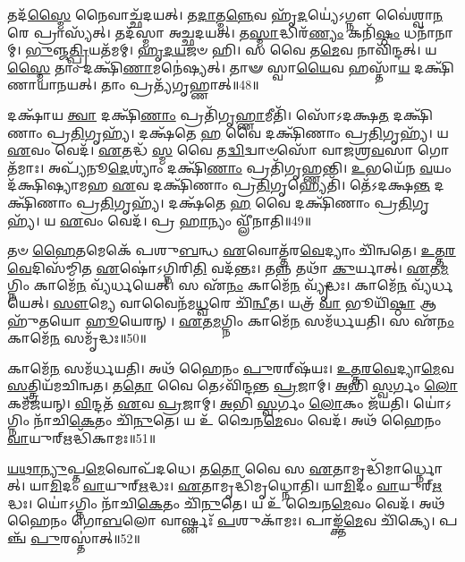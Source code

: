    𑌤𑌦᳴\-\ul{𑌸𑍍𑌮𑍈} 𑌨𑍈𑌵𑌾𑌚𑍍𑌛᳴𑌦𑌯𑌤𑍍।
   𑌤\-\ul{𑌦𑌾}\-𑌤𑍍𑌮\-\ul{𑌨𑍍𑌨𑍇}\-𑌵 𑌹𑍃᳴\-\ul{𑌦}\-𑌯𑍍𑌯𑍇॑𑌽𑌗𑍍𑌨𑍗 𑌵𑍈॑𑌶𑍍𑌵𑌾\-\ul{𑌨}\-𑌰𑍇 𑌪𑍍𑌰𑌾𑌸𑍍𑌯᳴𑌤𑍍।
   𑌤𑌦᳴𑌸𑍍𑌮𑌾 𑌅𑌚𑍍𑌛𑌦𑌯𑌤𑍍।
   𑌤\-\ul{𑌸𑍍𑌮𑌾}\-𑌦𑍍𑌧𑌿𑌰᳴\-\ul{𑌣𑍍𑌯𑌂} 𑌕𑌨𑌿᳴\-\ul{𑌷𑍍𑌠𑌂} 𑌧𑌨𑌾᳴𑌨𑌾𑌮𑍍।
   \ul{𑌭𑍁}\-𑌞𑍍𑌜\-\ul{𑌤𑍍𑌪𑍍𑌰𑌿}\-𑌯𑌤᳴𑌮𑌮𑍍।
   \ul{𑌹𑍃}\-\-\ul{𑌦}\-\-\ul{𑌯}\-𑌜𑍞 𑌹𑌿।
   𑌸 𑌵𑍈 𑌤\-\ul{𑌮𑍇}\-𑌵 𑌨𑌾𑌵𑌿᳴𑌨𑍍𑌦𑌤𑍍।
   𑌯\-\ul{𑌸𑍍𑌮𑍈} 𑌤𑌾𑌂 𑌦𑌕𑍍𑌷𑌿᳴\-\ul{𑌣𑌾}\-𑌮𑌨𑍇॑𑌷𑍍𑌯𑌤𑍍।
   𑌤𑌾𑍟 𑌸𑍍𑌵𑌾\-\ul{𑌯𑍈}\-𑌵 𑌹𑌸𑍍𑌤𑌾᳴\-\ul{𑌯} 𑌦𑌕𑍍𑌷𑌿᳴𑌣𑌾𑌯𑌾𑌨𑌯𑌤𑍍।
   𑌤𑌾𑌂 𑌪𑍍𑌰𑌤𑍍𑌯᳴𑌗𑍃𑌹𑍍𑌣𑌾𑌤𑍍॥48॥

   𑌦𑌕𑍍𑌷𑌾᳴𑌯 \ul{𑌤𑍍𑌵𑌾} 𑌦𑌕𑍍𑌷𑌿᳴\-\ul{𑌣𑌾𑌂} 𑌪𑍍𑌰𑌤𑌿᳴𑌗𑍃\-\ul{𑌹𑍍𑌣𑌾}\-𑌮𑍀𑌤𑌿᳴।
   𑌸𑍋᳴𑌽𑌦𑌕𑍍𑌷\-\ul{𑌤} 𑌦𑌕𑍍𑌷𑌿᳴𑌣𑌾𑌂 𑌪𑍍𑌰\-\ul{𑌤𑌿}\-𑌗𑍃𑌹𑍍𑌯᳴।
   𑌦𑌕𑍍𑌷᳴𑌤𑍇 \ul{𑌹} 𑌵𑍈 𑌦𑌕𑍍𑌷𑌿᳴𑌣𑌾𑌂 𑌪𑍍𑌰\-\ul{𑌤𑌿}\-𑌗𑍃𑌹𑍍𑌯᳴।
   𑌯 \ul{𑌏}\-𑌵𑌂 𑌵𑍇𑌦᳴।
   \ul{𑌏}\-𑌤𑌦𑍍𑌧᳴ \ul{𑌸𑍍𑌮} 𑌵𑍈 𑌤\-\ul{𑌦𑍍𑌵𑌿}\-𑌦𑍍𑌵𑌾𑍞𑌸𑍋᳴ 𑌵𑌾𑌜𑌶𑍍𑌰\-\ul{𑌵}\-𑌸𑌾 𑌗𑍋𑌤᳴𑌮𑌾𑌃।
   𑌅𑌪𑍍𑌯᳴𑌨𑍂\-\ul{𑌦𑍇}\-𑌶𑍍𑌯𑌾𑌂॑ 𑌦𑌕𑍍𑌷𑌿᳴\-\ul{𑌣𑌾𑌂} 𑌪𑍍𑌰𑌤𑌿᳴𑌗𑍃𑌹𑍍𑌣𑌨𑍍𑌤𑌿।
   \ul{𑌉}\-𑌭𑌯𑍇᳴𑌨 \ul{𑌵}\-𑌯𑌂 𑌦᳴𑌕𑍍𑌷𑌿𑌷𑍍𑌯𑌾𑌮𑌹 \ul{𑌏}\-𑌵 𑌦𑌕𑍍𑌷𑌿᳴𑌣𑌾𑌂 𑌪𑍍𑌰\-\ul{𑌤𑌿}\-𑌗𑍃𑌹𑍍𑌯𑍇𑌤𑌿᳴।
   𑌤𑍇᳴𑌽𑌦𑌕𑍍𑌷\-\ul{𑌨𑍍𑌤} 𑌦𑌕𑍍𑌷𑌿᳴𑌣𑌾𑌂 𑌪𑍍𑌰\-\ul{𑌤𑌿}\-𑌗𑍃𑌹𑍍𑌯᳴।
   𑌦𑌕𑍍𑌷᳴𑌤𑍇 \ul{𑌹} 𑌵𑍈 𑌦𑌕𑍍𑌷𑌿᳴𑌣𑌾𑌂 𑌪𑍍𑌰\-\ul{𑌤𑌿}\-𑌗𑍃𑌹𑍍𑌯᳴।
   𑌯 \ul{𑌏}\-𑌵𑌂 𑌵𑍇𑌦᳴।
   𑌪𑍍𑌰  \ul{𑌹𑌾}\-𑌨𑍍𑌯𑌂 𑌵𑍍𑌲𑍀᳴𑌨𑌾𑌤𑌿॥49॥
   \anuvakamend
  
   𑌤𑍞 \ul{𑌹𑍈}\-𑌤𑌮𑍇𑌕𑍇᳴ 𑌪𑌶𑍁\-\ul{𑌬}\-𑌨𑍍𑌧 \ul{𑌏}\-𑌵𑍋𑌤𑍍𑌤᳴𑌰\-\ul{𑌵𑍇}\-𑌦𑍍𑌯𑌾𑌂 𑌚𑌿᳴𑌨𑍍𑌵𑌤𑍇।
   \ul{𑌉}\-\-\ul{𑌤𑍍𑌤}\-\-\ul{𑌰}\-\-\ul{𑌵𑍇}\-𑌦𑌿𑌸᳴𑌮𑍍𑌮𑌿𑌤 \ul{𑌏}\-𑌷𑍋॑𑌽𑌗𑍍𑌨𑌿𑌰𑌿\-\ul{𑌤𑌿} 𑌵𑌦᳴𑌨𑍍𑌤𑌃।
   𑌤𑌨𑍍𑌨 𑌤𑌥𑌾᳴ \ul{𑌕𑍁}\-𑌰𑍍𑌯𑌾𑌤𑍍।
   \ul{𑌏}\-𑌤\-\ul{𑌮}\-𑌗𑍍𑌨𑌿𑌂 𑌕𑌾𑌮𑍇᳴\-\ul{𑌨} 𑌵𑍍𑌯᳴𑌰𑍍𑌧𑌯𑍇𑌤𑍍।
   𑌸 𑌏᳴\-\ul{𑌨𑌂} 𑌕𑌾𑌮𑍇᳴\-\ul{𑌨} 𑌵𑍍𑌯𑍃᳴𑌦𑍍𑌧𑌃।
   𑌕𑌾𑌮𑍇᳴\-\ul{𑌨} 𑌵𑍍𑌯᳴𑌰𑍍𑌧𑌯𑍇𑌤𑍍।
   \ul{𑌸𑍗}\-𑌮𑍍𑌯𑍇 𑌵𑌾𑌵𑍈𑌨᳴𑌮\-\ul{𑌧𑍍𑌵}\-𑌰𑍇 𑌚𑌿᳴\-\ul{𑌨𑍍𑌵𑍀}\-𑌤।
   𑌯𑌤𑍍𑌰᳴ \ul{𑌵𑌾} 𑌭𑍂𑌯𑌿᳴\-\ul{𑌷𑍍𑌠𑌾} 𑌆𑌹𑍁᳴𑌤𑌯𑍋 \ul{𑌹𑍂}\-𑌯𑍇𑌰𑌨𑍍।
   \ul{𑌏}\-𑌤\-\ul{𑌮}\-𑌗𑍍𑌨𑌿𑌂 𑌕𑌾𑌮𑍇᳴\-\ul{𑌨} 𑌸𑌮᳴𑌰𑍍𑌧𑌯𑌤𑌿।
   𑌸 𑌏᳴\-\ul{𑌨𑌂} 𑌕𑌾𑌮𑍇᳴\-\ul{𑌨} 𑌸𑌮𑍃᳴𑌦𑍍𑌧𑌃॥50॥

   𑌕𑌾𑌮𑍇᳴\-\ul{𑌨} 𑌸𑌮᳴𑌰𑍍𑌧𑌯𑌤𑌿।
   𑌅𑌥᳴ 𑌹𑍈𑌨𑌂 \ul{𑌪𑍁}\-𑌰𑌰𑍍{‌}𑌷᳴𑌯𑌃।
   \ul{𑌉}\-\-\ul{𑌤𑍍𑌤}\-\-\ul{𑌰}\-\-\ul{𑌵𑍇}\-𑌦𑍍𑌯𑌾\-\ul{𑌮𑍇}\-𑌵 \ul{𑌸}\-𑌤𑍍𑌤𑍍𑌰𑌿𑌯᳴𑌮𑌚𑌿𑌨𑍍𑌵𑌤।
   𑌤\-\ul{𑌤𑍋} 𑌵𑍈 𑌤𑍇𑌽𑌵𑌿᳴𑌨𑍍𑌦𑌨𑍍𑌤 \ul{𑌪𑍍𑌰}\-𑌜𑌾𑌮𑍍।
   \ul{𑌅}\-𑌭𑌿 \ul{𑌸𑍍𑌵}\-𑌰𑍍𑌗𑌂 \ul{𑌲𑍋}\-𑌕𑌮᳴𑌜𑌯𑌨𑍍।
   \ul{𑌵𑌿}\-𑌨𑍍𑌦𑌤᳴ \ul{𑌏}\-𑌵 \ul{𑌪𑍍𑌰}\-𑌜𑌾𑌮𑍍।
   \ul{𑌅}\-𑌭𑌿 \ul{𑌸𑍍𑌵}\-𑌰𑍍𑌗𑌂 \ul{𑌲𑍋}\-𑌕𑌂 𑌜᳴𑌯𑌤𑌿।
   𑌯𑍋॑𑌽𑌗𑍍𑌨𑌿𑌂 𑌨𑌾᳴𑌚𑌿\-\ul{𑌕𑍇}\-𑌤𑌂 𑌚𑌿᳴\-\ul{𑌨𑍁}\-𑌤𑍇।
   𑌯 𑌉᳴ 𑌚𑍈𑌨\-\ul{𑌮𑍇}\-𑌵𑌂 𑌵𑍇𑌦᳴।
   𑌅𑌥᳴ 𑌹𑍈𑌨𑌂 \ul{𑌵𑌾}\-𑌯𑍁𑌰𑍍{‌}𑌋𑌦𑍍𑌧𑌿᳴𑌕𑌾𑌮𑌃॥51॥

   \ul{𑌯}\-\-\ul{𑌥𑌾}\-\-\ul{𑌨𑍍𑌯𑍁}\-𑌪𑍍𑌤\-\ul{𑌮𑍇}\-𑌵𑍋𑌪᳴𑌦𑌧𑍇।
   𑌤\-\ul{𑌤𑍋} 𑌵𑍈 𑌸 \ul{𑌏}\-𑌤𑌾𑌮𑍃𑌦𑍍𑌧𑌿᳴𑌮𑌾𑌰𑍍𑌧𑍍𑌨𑍋𑌤𑍍।
   𑌯𑌾\-\ul{𑌮𑌿}\-𑌦𑌂 \ul{𑌵𑌾}\-𑌯𑍁𑌰𑍍{‌}\-\ul{𑌋}\-𑌦𑍍𑌧𑌃।
   \ul{𑌏}\-𑌤𑌾𑌮𑍃𑌦𑍍𑌧𑌿᳴𑌮𑍃𑌧𑍍𑌨𑍋𑌤𑌿।
   𑌯𑌾\-\ul{𑌮𑌿}\-𑌦𑌂 \ul{𑌵𑌾}\-𑌯𑍁𑌰𑍍{‌}\-\ul{𑌋}\-𑌦𑍍𑌧𑌃।
   𑌯𑍋॑𑌽𑌗𑍍𑌨𑌿𑌂 𑌨𑌾᳴𑌚𑌿\-\ul{𑌕𑍇}\-𑌤𑌂 𑌚𑌿᳴\-\ul{𑌨𑍁}\-𑌤𑍇।
   𑌯 𑌉᳴ 𑌚𑍈𑌨\-\ul{𑌮𑍇}\-𑌵𑌂 𑌵𑍇𑌦᳴।
   𑌅𑌥᳴ 𑌹𑍈𑌨𑌂 𑌗𑍋\-\ul{𑌬}\-𑌲𑍋 𑌵𑌾𑌰𑍍𑌷𑍍𑌣𑌃᳴ \ul{𑌪}\-𑌶𑍁𑌕𑌾᳴𑌮𑌃।
   𑌪𑌾𑌙𑍍𑌕𑍍𑌤᳴\-\ul{𑌮𑍇}\-𑌵 𑌚𑌿᳴𑌕𑍍𑌯𑍇।
   𑌪𑌞𑍍𑌚᳴ \ul{𑌪𑍁}\-𑌰𑌸𑍍𑌤𑌾॑𑌤𑍍॥52॥


